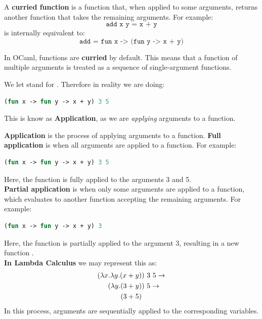 \newpage

\begin{Def}

A \textbf{curried function} is a function that, when applied to some arguments, returns another function that takes the remaining arguments. For example:
\[
\texttt{add x y = x + y}
\]
is internally equivalent to:
\[
\texttt{add = fun x -> (fun y -> x + y)}
\]

In OCaml, functions are \textbf{curried} by default. This means that a function of multiple arguments is treated as a sequence of single-argument functions.
\end{Def}

\vspace{1em}
\noindent
We let  stand for . Therefore in reality we are doing:
\begin{lstlisting}[language=OCaml]
    (fun x -> fun y -> x + y) 3 5
\end{lstlisting}

\noindent
This is know as \textbf{Application}, as we are \textit{applying} arguments to a function.

\vspace{1em}
\begin{Def}[Application]

    \textbf{Application} is the process of applying arguments to a function. \textbf{Full application} is when all 
    arguments are applied to a function. For example:

    \begin{lstlisting}[language=OCaml, numbers=none]
        (fun x -> fun y -> x + y) 3 5
    \end{lstlisting}

    \noindent
    Here, the function  is fully applied to the arguments 3 and 5.\\

    \noindent
    \textbf{Partial application} is when only some arguments are applied to a function, which evaluates to another function 
    accepting the remaining arguments. For example:

    \begin{lstlisting}[language=OCaml, numbers=none]
        (fun x -> fun y -> x + y) 3
    \end{lstlisting}

    \noindent
    Here, the function  is partially applied to the argument 3, resulting in a new function
    .\\

    \noindent
    \textbf{In Lambda Calculus} we may represent this as:
    \begin{align*}
        (\lambda x. \lambda y. (x + y))&\ 3\ 5 \rightarrow\\
        (\lambda y. (3 + y))&\ 5 \rightarrow\\
        (3 + 5) \hspace{.4em} &
    \end{align*}
    In this process, arguments are sequentially applied to the corresponding variables.
\end{Def}

